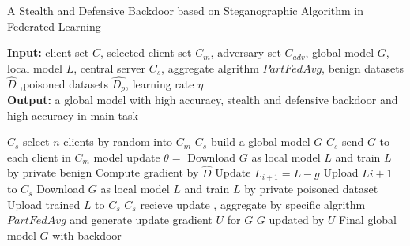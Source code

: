 \documentclass{article}
\begin{document}
\begin{algorithm}[t]
	\caption{A Stealth and Defensive Backdoor based on Steganographic Algorithm in Federated Learning} %
	\hspace*{0.02in} {\bf Input:} %
	{client set $C$, selected client set $C_m$, adversary set $C_{adv}$, global model $G$, local model $L$, central server $C_s$, aggregate algrithm $PartFedAvg$, benign datasets $\hat{D}$ ,poisoned datasets $\hat{D_p}$, learning rate $\eta$}\\
	\hspace*{0.02in} {\bf Output:} %
	a global model with high accuracy, stealth and defensive backdoor and high accuracy in main-task


	\begin{algorithmic}[1]

	\State $C_s$ select $n$ clients by random into $C_m$ %
	\State $C_s$ build a global model $G$
	\State $C_s$ send $G$ to each client in $C_m$
	\State model update $\theta  = $
				\State Download $G$ as local model $L$ and train $L$ by private benign 
				\State Compute gradient by $\hat{D}$ 
				\State Update $L_{i+1} = L - g$
				\State Upload $L{i+1}$ to $C_s$
				\State Download $G$ as local model $L$ and train $L$ by private poisoned dataset
				\State Upload trained $L$ to $C_s$
			\EndIf
			\State $C_s$ recieve update , aggregate by specific algrithm $PartFedAvg$
	and generate update gradient $U$ for $G$
			\State $G$ updated by $U$
		\EndFor
	\EndFor
\State \Return Final global model $G$ with backdoor

	\end{algorithmic}
	

\end{algorithm}
\end{document}
